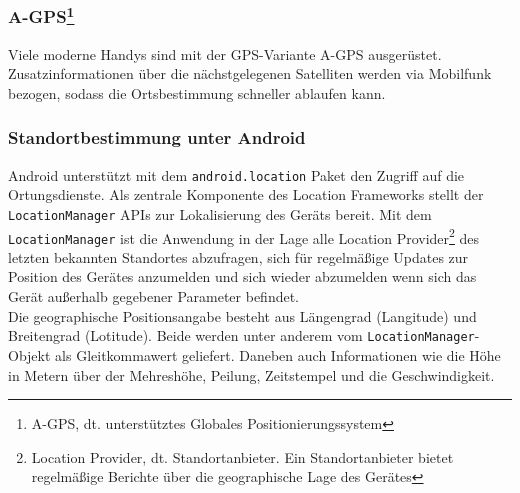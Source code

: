 \subsubsection[\gls{A-GPS}]{\gls{A-GPS}\footnote{ A-GPS, dt. unterstütztes Globales Positionierungssystem}}
Viele moderne Handys sind mit der \gls{GPS}-Variante \gls{A-GPS} ausgerüstet. 
Zusatzinformationen über die nächstgelegenen Satelliten werden via Mobilfunk bezogen, sodass die Ortsbestimmung schneller ablaufen kann. 
\subsubsection{Standortbestimmung unter Android}
Android unterstützt mit dem \texttt{android.location} Paket den Zugriff auf die Ortungsdienste. Als zentrale Komponente des Location Frameworks stellt der \texttt{LocationManager} \glspl{API} zur Lokalisierung des Geräts bereit. Mit dem \texttt{LocationManager} ist die Anwendung in der Lage alle Location Provider\footnote{ Location Provider, dt. Standortanbieter. Ein Standortanbieter bietet regelmäßige Berichte über die geographische Lage des Gerätes} des letzten bekannten Standortes abzufragen, sich für regelmäßige Updates zur Position des Gerätes anzumelden und sich wieder abzumelden wenn sich das Gerät außerhalb gegebener Parameter befindet. \cite{android_gps} \\
Die geographische Positionsangabe besteht aus Längengrad (Langitude) und Breitengrad (Lotitude). Beide werden unter anderem vom \texttt{LocationManager}-Objekt als Gleitkommawert geliefert. Daneben auch Informationen wie die Höhe in Metern über der Mehreshöhe, Peilung, Zeitstempel und die Geschwindigkeit.\\
\clearpage

